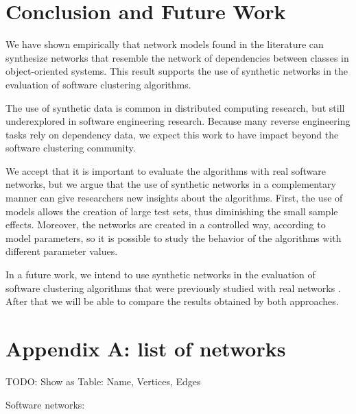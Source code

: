 \section{Conclusion and Future Work}

We have shown empirically that network models found in the literature can
synthesize networks that resemble the network of dependencies between classes in
object-oriented systems. This result supports the use of synthetic networks in
the evaluation of software clustering algorithms.

The use of synthetic data is common in distributed computing research, but still
underexplored in software engineering research. Because many reverse engineering
tasks rely on dependency data, we expect this work to have impact beyond the
software clustering community.


We accept that it is important to evaluate the algorithms with real software
networks, but we argue that the use of synthetic networks in a complementary
manner can give researchers new insights about the algorithms. First, the use of
models allows the creation of large test sets, thus diminishing the small sample
effects. Moreover, the networks are created in a controlled way, according to
model parameters, so it is possible to study the behavior of the algorithms with
different parameter values.

In a future work, we intend to use synthetic networks in the evaluation of
software clustering algorithms that were previously studied with real networks
\cite{Wu2005}. After that we will be able to compare the results obtained by
both approaches.

\section{Appendix A: list of networks}

TODO: Show as Table: Name, Vertices, Edges

Software networks:

